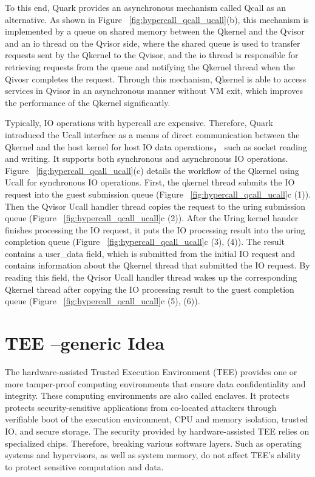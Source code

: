 To this end, Quark provides an asynchronous mechanism called Qcall as an alternative. 
As shown in Figure ~\ref{fig:hypercall_qcall_ucall}(b), this mechanism is implemented by a queue on shared memory between the Qkernel and the Qvisor and an io thread on the Qvisor side, where the
shared queue is used to transfer requests sent by the Qkernel to the Qvisor, and the io thread is responsible for retrieving requests from the queue and notifying the Qkernel thread when the Qivosr completes 
the request. Through this mechanism, Qkernel is able to access services in Qvisor in an asynchronous manner without VM exit, which improves the performance of the Qkernel significantly.

Typically, IO operations with hypercall are expensive. Therefore, Quark introduced the Ucall interface as a means of direct communication between the Qkernel and the host kernel for host 
IO data operations，  such as socket reading and writing. It supports both synchronous and asynchronous IO operations. Figure ~\ref{fig:hypercall_qcall_ucall}(c) details the workflow of the Qkernel 
using Ucall for synchronous IO operations. First, the qkernel thread submits the IO request into the guest submission queue (Figure ~\ref{fig:hypercall_qcall_ucall}c (1)). Then the Qvisor Ucall handler thread copies the request to the uring submission 
queue (Figure ~\ref{fig:hypercall_qcall_ucall}c (2)). After the Uring kernel hander finishes processing the IO request, it puts the IO processing result into the uring completion queue (Figure ~\ref{fig:hypercall_qcall_ucall}c (3), (4)). The result 
contains a user\_data field, which is submitted from the initial IO request and contains information about the Qkernel thread that submitted the IO request. By reading this field, the Qvisor Ucall handler thread wakes up the corresponding Qkernel thread 
after copying the IO processing result to the guest completion queue (Figure ~\ref{fig:hypercall_qcall_ucall}c (5), (6)).



\section{TEE --generic Idea}
The hardware-assisted Trusted Execution Environment (TEE) provides one or more tamper-proof computing environments that ensure data confidentiality and integrity. These computing environments are also called enclaves. It protects protects security-sensitive applications from co-located attackers 
through verifiable boot of the execution environment, CPU and memory isolation, trusted IO, and secure storage\cite*{Hardware-supported-TEE}. The security provided by hardware-assisted TEE relies on specialized chips. Therefore, breaking various software layers.
Such as operating systems and hypervisors, as well as system memory, do not affect TEE's ability to protect sensitive computation and data\cite*{7345265}.

